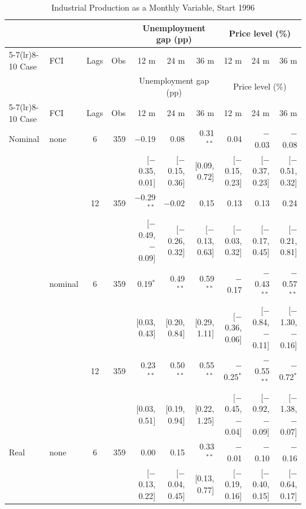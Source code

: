 \begingroup\scriptsize\setlength{\tabcolsep}{0.9pt}
\begin{longtable}{llcrrrrrrr}
\caption{Industrial Production as a Monthly Variable, Start 1996}\label{tab:appR2}\\
\toprule
 & & & & \multicolumn{3}{c}{Unemployment gap (pp)} & \multicolumn{3}{c}{Price level (\%)}\\ \cmidrule(lr){5-7}\cmidrule(lr){8-10}
Case & FCI & Lags & Obs & 12 m & 24 m & 36 m & 12 m & 24 m & 36 m\\
\midrule\endfirsthead
\toprule
 & & & & \multicolumn{3}{c}{Unemployment gap (pp)} & \multicolumn{3}{c}{Price level (\%)}\\ \cmidrule(lr){5-7}\cmidrule(lr){8-10}
Case & FCI & Lags & Obs & 12 m & 24 m & 36 m & 12 m & 24 m & 36 m\\
\midrule\endhead
\bottomrule\endfoot
Nominal & none & 6 & 359 & $-$0.19 & 0.08 & 0.31$^{**}$ & 0.04 & $-$0.03 & $-$0.08\\
 & & & & {\scriptsize [$-$0.35, 0.01]} & {\scriptsize [$-$0.15, 0.36]} & {\scriptsize [0.09, 0.72]} & {\scriptsize [$-$0.15, 0.23]} & {\scriptsize [$-$0.37, 0.23]} & {\scriptsize [$-$0.51, 0.32]}\\
 &  & 12 & 359 & $-$0.29$^{**}$ & $-$0.02 & 0.15 & 0.13 & 0.13 & 0.24\\
 & & & & {\scriptsize [$-$0.49, $-$0.09]} & {\scriptsize [$-$0.26, 0.32]} & {\scriptsize [$-$0.13, 0.63]} & {\scriptsize [$-$0.03, 0.32]} & {\scriptsize [$-$0.17, 0.45]} & {\scriptsize [$-$0.21, 0.81]}\\
 & nominal & 6 & 359 & 0.19$^{*}$ & 0.49$^{**}$ & 0.59$^{**}$ & $-$0.17 & $-$0.43$^{**}$ & $-$0.57$^{**}$\\
 & & & & {\scriptsize [0.03, 0.43]} & {\scriptsize [0.20, 0.84]} & {\scriptsize [0.29, 1.11]} & {\scriptsize [$-$0.36, 0.06]} & {\scriptsize [$-$0.84, $-$0.11]} & {\scriptsize [$-$1.30, $-$0.16]}\\
 &  & 12 & 359 & 0.23$^{**}$ & 0.50$^{**}$ & 0.55$^{**}$ & $-$0.25$^{*}$ & $-$0.55$^{**}$ & $-$0.72$^{*}$\\
 & & & & {\scriptsize [0.03, 0.51]} & {\scriptsize [0.19, 0.94]} & {\scriptsize [0.22, 1.25]} & {\scriptsize [$-$0.45, $-$0.04]} & {\scriptsize [$-$0.92, $-$0.09]} & {\scriptsize [$-$1.38, $-$0.07]}\\
\addlinespace
Real & none & 6 & 359 & 0.00 & 0.15 & 0.33$^{**}$ & $-$0.01 & $-$0.10 & $-$0.16\\
 & & & & {\scriptsize [$-$0.13, 0.22]} & {\scriptsize [$-$0.04, 0.45]} & {\scriptsize [0.13, 0.77]} & {\scriptsize [$-$0.19, 0.16]} & {\scriptsize [$-$0.40, 0.15]} & {\scriptsize [$-$0.64, 0.17]}\\

\end{longtable}
